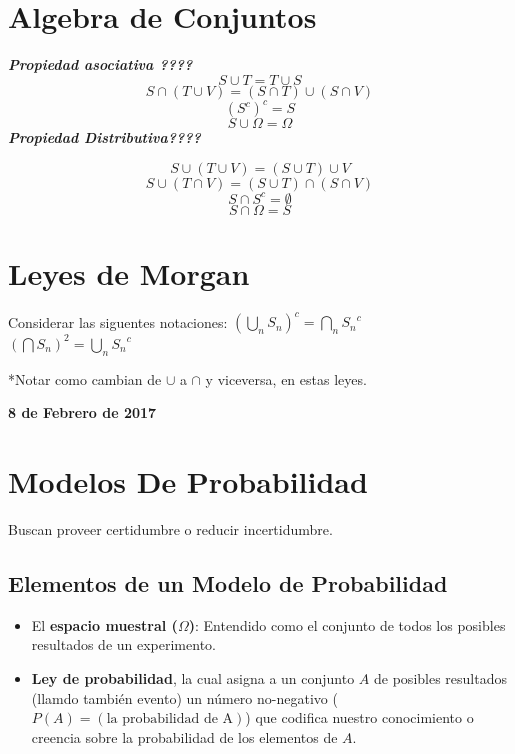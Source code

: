 \documentclass[]{book}
\providecommand{\tightlist}{%
  \setlength{\itemsep}{0pt}\setlength{\parskip}{0pt}}
\begin{document}
\section{Algebra de Conjuntos}\label{algebra-de-conjuntos}

\textbf{\emph{Propiedad asociativa ????}} \[S \cup T = T \cup S\]
\[S \cap (T \cup V) = (S \cap T) \cup (S \cap V)\] \[(S^c)^c = S\]
\[S \cup \Omega = \Omega\] \textbf{\emph{Propiedad Distributiva????}}

\[S \cup (T \cup V) = (S \cup T)\cup V\]
\[S \cup (T \cap V) = (S \cup T)\cap (S \cap V)\]
\[S \cap S^c = \emptyset\] \[S \cap \Omega = S\]

\section{Leyes de Morgan}\label{leyes-de-morgan}

Considerar las siguentes notaciones:
\((\bigcup_{n}^{}S_n)^c = \bigcap_{n}^{}{S_n}^c\)\\
 \((\bigcap S_n)^2 = \bigcup_{n}^{}{S_n}^c\)

*Notar como cambian de \(\cup\) a \(\cap\) y viceversa, en estas leyes.

\textbf{8 de Febrero de 2017}

\section{Modelos De Probabilidad}\label{modelos-de-probabilidad}

Buscan proveer certidumbre o reducir incertidumbre.

\subsection{Elementos de un Modelo de
Probabilidad}\label{elementos-de-un-modelo-de-probabilidad}

\begin{itemize}
\tightlist
\item
  El \textbf{espacio muestral (\(\Omega\))}: Entendido como el conjunto
  de todos los posibles resultados de un experimento.
\item
  \textbf{Ley de probabilidad}, la cual asigna a un conjunto \(A\) de
  posibles resultados (llamdo también evento) un número no-negativo
  (\(P(A) = (\text{la probabilidad de A})\)) que codifica nuestro
  conocimiento o creencia sobre la probabilidad de los elementos de
  \(A\).
\end{itemize}
\end{document}
